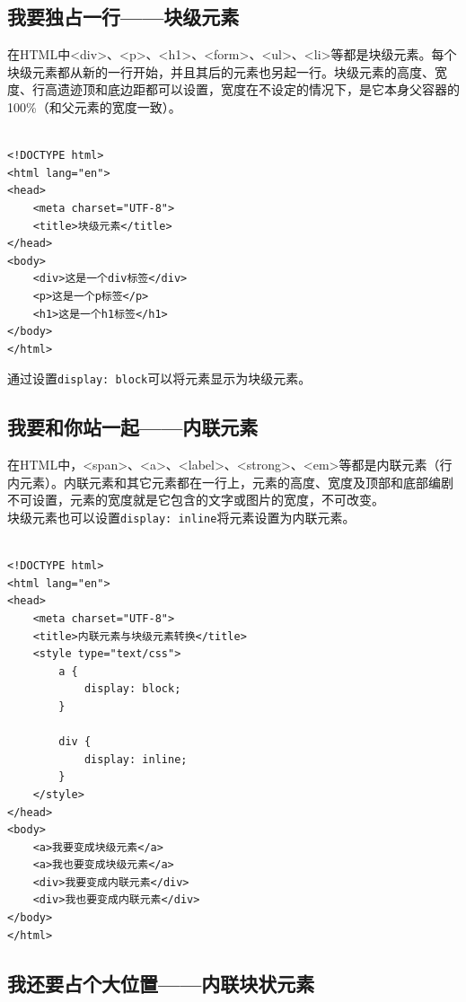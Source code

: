 \subsection{我要独占一行——块级元素}

在HTML中<div>、<p>、<h1>、<form>、<ul>、<li>等都是块级元素。每个块级元素都从新的一行开始，并且其后的元素也另起一行。块级元素的高度、宽度、行高遗迹顶和底边距都可以设置，宽度在不设定的情况下，是它本身父容器的100\%（和父元素的宽度一致）。 \\

 \\

\begin{lstlisting}[style=htmlcssjs]
<!DOCTYPE html>
<html lang="en">
<head>
    <meta charset="UTF-8">
    <title>块级元素</title>
</head>
<body>
    <div>这是一个div标签</div>
    <p>这是一个p标签</p>
    <h1>这是一个h1标签</h1>
</body>
</html>
\end{lstlisting}

通过设置\lstinline|display: block|可以将元素显示为块级元素。

\subsection{我要和你站一起——内联元素}

在HTML中，<span>、<a>、<label>、<strong>、<em>等都是内联元素（行内元素）。内联元素和其它元素都在一行上，元素的高度、宽度及顶部和底部编剧不可设置，元素的宽度就是它包含的文字或图片的宽度，不可改变。 \\

块级元素也可以设置\lstinline|display: inline|将元素设置为内联元素。 \\

 \\

\begin{lstlisting}[style=htmlcssjs]
<!DOCTYPE html>
<html lang="en">
<head>
    <meta charset="UTF-8">
    <title>内联元素与块级元素转换</title>
    <style type="text/css">
        a {
            display: block;
        }

        div {
            display: inline;
        }
    </style>
</head>
<body>
    <a>我要变成块级元素</a>
    <a>我也要变成块级元素</a>
    <div>我要变成内联元素</div>
    <div>我也要变成内联元素</div>
</body>
</html>
\end{lstlisting}

\subsection{我还要占个大位置——内联块状元素}


